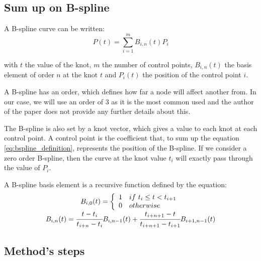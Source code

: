 \documentclass{article}
\newcommand{\vsp}{\vspace{\baselineskip}}
\begin{document}
\subsection{Sum up on B-spline}

A B-spline curve can be written: 
\begin{equation}
    \label{eq:bspline_definition}
    P(t)=\sum\limits_{i=1}^m B_{i,n}(t)P_i
\end{equation}

with $t$ the value of the knot, $m$ the number of control points, $B_{i,n}(t)$ the basis element of order $n$ at the knot $t$ and $P_i(t)$ the position of the control point $i$.

\vsp

A B-spline has an order, which defines how far a node will affect another from. In our case, we will use an order of 3 as it is the most common used and the author of the paper does not provide any further details about this.

\vsp

The B-spline is also set by a knot vector, which gives a value to each knot at each control point. A control point is the coefficient that, to sum up the equation \ref{eq:bspline_definition}, represents the position of the B-spline. If we consider a zero order B-spline, then the curve at the knot value $t_i$ will exactly pass through the value of $P_i$.

\vsp

A B-spline basis element is a recursive function defined by the equation:
\begin{equation}
    \begin{array}{c c}
        B_{i,0}(t) = 
        \left \{
        \begin{array}{l l}
            1 & if\ t_i \leq t < t_{i+1} \\
            0 & otherwise
        \end{array}
        \right .
        \\
        B_{i,n}(t) = \cfrac{t-t_i}{t_{i+n}-t_i}B_{i,n-1}(t) + 
                     \cfrac{t_{i+n+1}-t}{t_{i+n+1}-t_{i+1}}B_{i+1,n-1}(t)
    \end{array}
\end{equation}


\subsection{Method's steps} \label{sec:method_steps}
\end{document}
